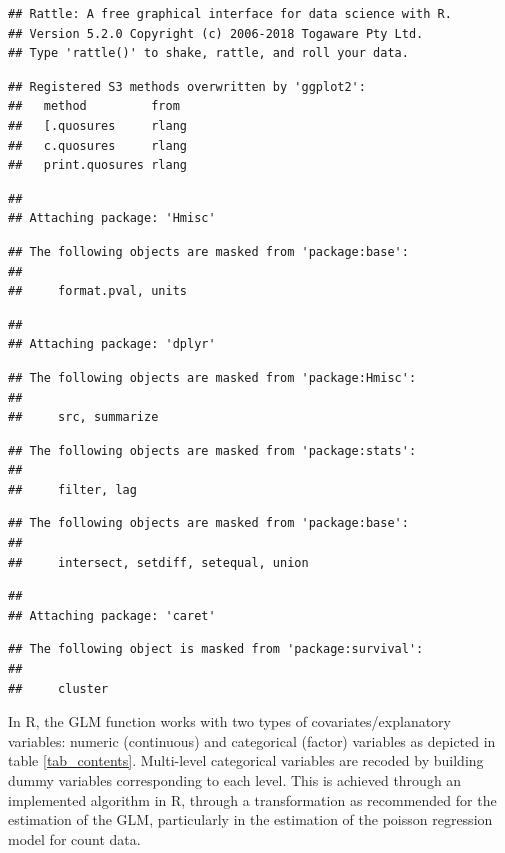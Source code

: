 \documentclass[]{article}
\begin{document}
\begin{verbatim}
## Rattle: A free graphical interface for data science with R.
## Version 5.2.0 Copyright (c) 2006-2018 Togaware Pty Ltd.
## Type 'rattle()' to shake, rattle, and roll your data.
\end{verbatim}

\begin{verbatim}
## Registered S3 methods overwritten by 'ggplot2':
##   method         from 
##   [.quosures     rlang
##   c.quosures     rlang
##   print.quosures rlang
\end{verbatim}

\begin{verbatim}
## 
## Attaching package: 'Hmisc'
\end{verbatim}

\begin{verbatim}
## The following objects are masked from 'package:base':
## 
##     format.pval, units
\end{verbatim}

\begin{verbatim}
## 
## Attaching package: 'dplyr'
\end{verbatim}

\begin{verbatim}
## The following objects are masked from 'package:Hmisc':
## 
##     src, summarize
\end{verbatim}

\begin{verbatim}
## The following objects are masked from 'package:stats':
## 
##     filter, lag
\end{verbatim}

\begin{verbatim}
## The following objects are masked from 'package:base':
## 
##     intersect, setdiff, setequal, union
\end{verbatim}

\begin{verbatim}
## 
## Attaching package: 'caret'
\end{verbatim}

\begin{verbatim}
## The following object is masked from 'package:survival':
## 
##     cluster
\end{verbatim}

In R, the GLM function works with two types of covariates/explanatory
variables: numeric (continuous) and categorical (factor) variables as
depicted in table \ref{tab_contents}. Multi-level categorical variables
are recoded by building dummy variables corresponding to each level.
This is achieved through an implemented algorithm in R, through a
transformation as recommended for the estimation of the GLM,
particularly in the estimation of the poisson regression model for count
data.\medskip
\end{document}
